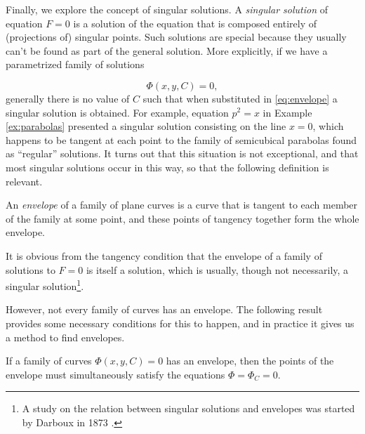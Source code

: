 Finally, we explore the concept of singular solutions. A \textit{singular solution} of equation $F=0$ is a solution of the equation that is composed entirely of (projections of) singular points. Such solutions are special because they usually can't be found as part of the general solution. More explicitly, if we have a parametrized family of solutions

\begin{equation} \label{eq:envelope}
  \Phi(x,y,C)=0,
\end{equation}
generally there is no value of $C$ such that when substituted in \eqref{eq:envelope} a singular solution is obtained. For example, equation $p^2=x$ in Example \ref{ex:parabolas} presented a singular solution consisting on the line $x=0$, which happens to be tangent at each point to the family of semicubical parabolas found as ``regular'' solutions. It turns out that this situation is not exceptional, and that most singular solutions occur in this way, so that the following definition is relevant.

\begin{definition}An \textit{envelope} of a family of plane curves is a curve that is tangent to each member of the family at some point, and these points of tangency together form the whole envelope.

\end{definition}

\begin{remark} It is obvious from the tangency condition that the envelope of a family of solutions to $F=0$ is itself a solution, which is usually, though not necessarily, a singular solution\footnote{A study on the relation between singular solutions and envelopes was started by Darboux in 1873 \cite{darboux1873solutions}.}.
\end{remark}

However, not every family of curves has an envelope. The following result provides some necessary conditions for this to happen, and in practice it gives us a method to find envelopes.

\begin{theorem}
If a family of curves $\Phi(x,y,C)=0$ has an envelope, then the points of the envelope must simultaneously satisfy the equations $\Phi = \Phi_C=0$.
\end{theorem}

